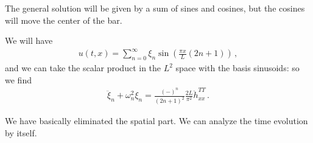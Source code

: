 \documentclass[main.tex]{subfiles}
\begin{document}
The general solution will be given by a sum of sines and cosines, but the cosines will move the center of the bar. 

We will have 
%
\begin{align}
u(t, x) = \sum _{n=0}^{ \infty } \xi_{n} \sin( \frac{\pi x}{L} (2 n + 1))
\,,
\end{align}
%
and we can take the scalar product in the \(L^{2}\) space with the basis sinusoids: so we find 
%
\begin{align}
\ddot{\xi}_{n} + \omega^2_{n} \xi_{n} = \frac{(-)^{n}}{(2n+1)^2} \frac{2L}{\pi^2} \ddot{h}^{TT}_{xx}
\,.
\end{align}

We have basically eliminated the spatial part. 
We can analyze the time evolution by itself. 
\end{document}
